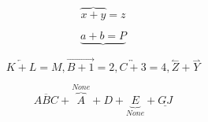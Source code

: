 \documentclass{book}
\begin{document}
$$\overbrace{x+y}=z$$

$$\underbrace{a+b=P}$$

$$\overleftarrow{K+L}=M , \overrightarrow{B+1}=2, \overleftrightarrow{C+3}=4, \overset{\leftharpoonup}{Z}+\overset{\rightharpoonup}{Y}$$

$$\overline{ABC}+\overset{None}{\overbrace{A}}+D+\underset{None}{\underbrace{E}}+\underline{GJ}$$
\end{document}
